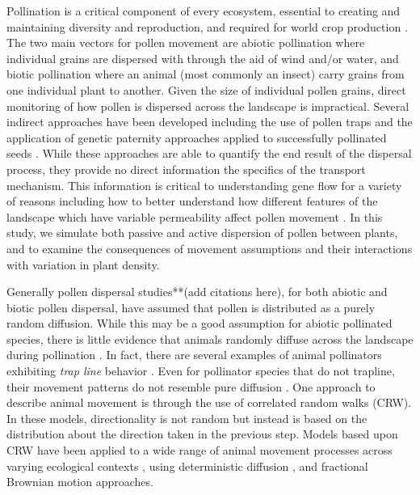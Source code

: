 Pollination is a critical component of every ecosystem, essential to creating
and maintaining diversity and reproduction, and required for world crop
production \cite{KleinEtAl2007}.  The two main vectors for pollen movement are
abiotic pollination where individual grains are dispersed with through the aid
of wind and/or water, and biotic pollination where an animal (most commonly an
insect) carry grains from one individual plant to another.  Given the size of
individual pollen grains, direct monitoring of how pollen is dispersed across
the landscape is impractical.  Several indirect approaches have been developed
including the use of pollen traps and the application of genetic paternity
approaches applied to successfully pollinated seeds
\cite{BitzerPatterson1967,StreiffEtAl1999}.  While these approaches are able to
quantify the end result of the dispersal process, they provide no direct
information the specifics of the transport mechanism.  This information is
critical to understanding gene flow for a variety of reasons including how to
better understand how different features of the landscape which have variable
permeability affect pollen movement \cite{DyerSork2001,DyerEtAl2012}. In this
study, we simulate both passive and active dispersion of pollen between plants,
and to examine the consequences of movement assumptions and their interactions
with variation in plant density.

Generally pollen dispersal studies**(add citations here), for both abiotic and
biotic pollen dispersal, have assumed that pollen is distributed as a purely
random diffusion.  While this may be a good assumption for abiotic pollinated
species, there is little evidence that animals randomly diffuse across the
landscape during pollination \cite{LevinKerster}.  In fact, there are several
examples of animal pollinators exhibiting \emph{trap line} behavior \cite[e.g.,
repeated sequential visits to individual plants]{OhashiThomson}. Even for
pollinator species that do not trapline, their movement patterns do not resemble
pure diffusion \cite{Cresswell03}. One approach to describe animal movement is
through the use of correlated random walks (CRW).  In these models,
directionality is not random but instead is based on the distribution about the
direction taken in the previous step.  Models based upon CRW have been applied
to a wide range of animal movement processes across varying ecological contexts
\cite{Bartumeus07,Byers01}, using deterministic diffusion \cite{Klages}, and
fractional Brownian motion \cite{Enriquez} approaches.

